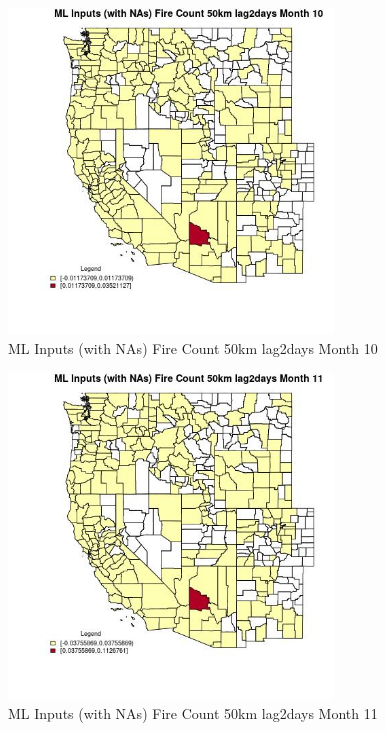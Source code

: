 \begin{figure} 
\centering  
\includegraphics[width=0.77\textwidth]{Code_Outputs/Report_ML_input_PM25_Step4_part_e_de_duplicated_aves_compiled_2019-05-21wNAs_CountyFire_Count_50km_lag2daysmedianMonth10.jpg} 
\caption{\label{fig:Report_ML_input_PM25_Step4_part_e_de_duplicated_aves_compiled_2019-05-21wNAsCountyFire_Count_50km_lag2daysmedianMonth10}ML Inputs (with NAs) Fire Count 50km lag2days Month 10} 
\end{figure} 
 

\begin{figure} 
\centering  
\includegraphics[width=0.77\textwidth]{Code_Outputs/Report_ML_input_PM25_Step4_part_e_de_duplicated_aves_compiled_2019-05-21wNAs_CountyFire_Count_50km_lag2daysmedianMonth11.jpg} 
\caption{\label{fig:Report_ML_input_PM25_Step4_part_e_de_duplicated_aves_compiled_2019-05-21wNAsCountyFire_Count_50km_lag2daysmedianMonth11}ML Inputs (with NAs) Fire Count 50km lag2days Month 11} 
\end{figure} 
 

